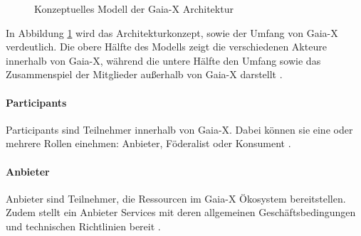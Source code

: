 \begin{figure}[h]
  \centering
  \caption{Konzeptuelles Modell der Gaia-X Architektur}
  \label{fig:gaia-x-concept-architecture}
\end{figure}



In Abbildung \ref{fig:gaia-x-concept-architecture} wird das Architekturkonzept, sowie der Umfang von Gaia-X verdeutlich.
Die obere Hälfte des Modells zeigt die verschiedenen Akteure innerhalb von Gaia-X, während die
untere Hälfte den Umfang sowie das Zusammenspiel der Mitglieder außerhalb von Gaia-X darstellt \cite{GaiaXArchitecture2021}.

\paragraph{Participants}
Participants sind Teilnehmer innerhalb von Gaia-X. 
Dabei können sie eine oder mehrere Rollen einehmen: Anbieter, Föderalist oder Konsument \cite{GaiaXArchitecture2021}.

\paragraph{Anbieter}
Anbieter sind Teilnehmer, die Ressourcen im Gaia-X Ökosystem bereitstellen. Zudem stellt
ein Anbieter Services mit deren allgemeinen Geschäftsbedingungen und technischen Richtlinien bereit \cite{GaiaXArchitecture2021}.


